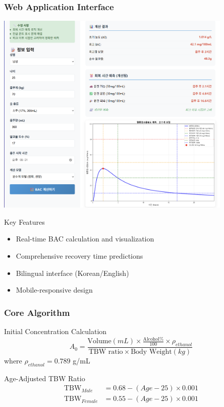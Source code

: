 \documentclass{beamer}
\begin{document}
\begin{frame}
\frametitle{Web Application Interface}
\begin{center}
\includegraphics[width=0.85\textwidth]{Web_calculator.png}
\end{center}

\begin{alertblock}{Key Features}
\begin{itemize}
    \item Real-time BAC calculation and visualization
    \item Comprehensive recovery time predictions
    \item Bilingual interface (Korean/English)
    \item Mobile-responsive design
\end{itemize}
\end{alertblock}
\end{frame}

\begin{frame}
\frametitle{Core Algorithm}
\begin{block}{Initial Concentration Calculation}
$$A_0 = \frac{\text{Volume}(mL) \times \frac{\text{Alcohol}\%}{100} \times \rho_{ethanol}}{\text{TBW ratio} \times \text{Body Weight}(kg)}$$
where $\rho_{ethanol} = 0.789$ g/mL
\end{block}

\begin{block}{Age-Adjusted TBW Ratio}
\begin{align}
\text{TBW}_{Male} &= 0.68 - (Age - 25) \times 0.001 \\
\text{TBW}_{Female} &= 0.55 - (Age - 25) \times 0.001
\end{align}
\end{block}
\end{frame}
\end{document}
